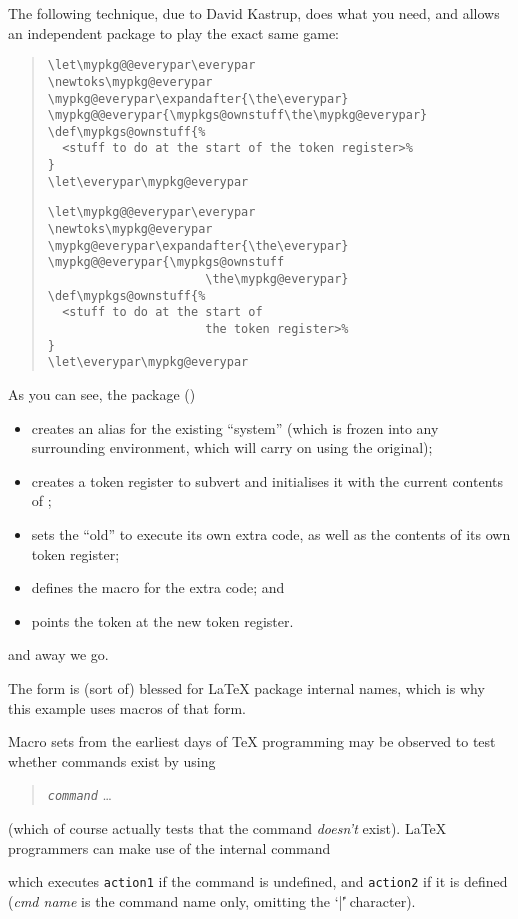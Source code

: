 The following technique, due to David Kastrup, does what you need, and
allows an independent package to play the exact same game:
\begin{quote}
\begin{wideversion}
\begin{verbatim}
\let\mypkg@@everypar\everypar
\newtoks\mypkg@everypar
\mypkg@everypar\expandafter{\the\everypar}
\mypkg@@everypar{\mypkgs@ownstuff\the\mypkg@everypar}
\def\mypkgs@ownstuff{%
  <stuff to do at the start of the token register>%
}
\let\everypar\mypkg@everypar
\end{verbatim}
\end{wideversion}
\begin{narrowversion}
\begin{verbatim}
\let\mypkg@@everypar\everypar
\newtoks\mypkg@everypar
\mypkg@everypar\expandafter{\the\everypar}
\mypkg@@everypar{\mypkgs@ownstuff
                      \the\mypkg@everypar}
\def\mypkgs@ownstuff{%
  <stuff to do at the start of
                      the token register>%
}
\let\everypar\mypkg@everypar
\end{verbatim}
\end{narrowversion}
\end{quote}
As you can see, the package ()
\begin{itemize}
\item creates an alias for the existing ``system'' 
  (which is frozen into any surrounding environment, which will carry
  on using the original);
\item creates a token register to subvert  and
  initialises it with the current contents of ;
\item sets the ``old''  to execute its own extra code,
  as well as the contents of its own token register;
\item defines the macro for the extra code; and
\item points the token  at the new token register.
\end{itemize}
and away we go.

The form  is (sort of) blessed for \LaTeX{} package
internal names, which is why this example uses macros of that form.


Macro sets from the earliest days of \TeX{} programming may be
observed to test whether commands exist by using
\begin{quote}
 \csx{}\texttt{\emph{command}}   \dots{}
\end{quote}
(which of course actually tests that the command \emph{doesn't}
exist).  \LaTeX{} programmers can make use of the internal command
\begin{quote}
\end{quote}
which executes \texttt{action1} if the command is undefined, and
\texttt{action2} if it is defined
(\emph{cmd name} is the command name only, omitting the `|\|' character).


